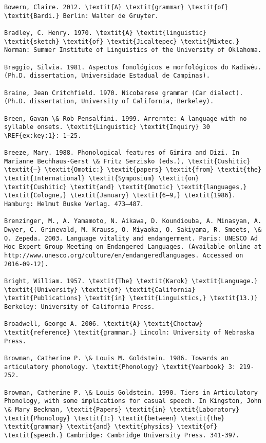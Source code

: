 \begin{verbatim}
Bowern, Claire. 2012. \textit{A} \textit{grammar} \textit{of} \textit{Bardi.} Berlin: Walter de Gruyter.

Bradley, C. Henry. 1970. \textit{A} \textit{linguistic} \textit{sketch} \textit{of} \textit{Jicaltepec} \textit{Mixtec.} Norman: Summer Institute of Linguistics of the University of Oklahoma.

Braggio, Silvia. 1981. Aspectos fonológicos e morfológicos do Kadiwéu. (Ph.D. dissertation, Universidade Estadual de Campinas).

Braine, Jean Critchfield. 1970. Nicobarese grammar (Car dialect). (Ph.D. dissertation, University of California, Berkeley).

Breen, Gavan \& Rob Pensalfini. 1999. Arrernte: A language with no syllable onsets. \textit{Linguistic} \textit{Inquiry} 30 \REF{ex:key:1}: 1–25.

Breeze, Mary. 1988. Phonological features of Gimira and Dizi. In Marianne Bechhaus-Gerst \& Fritz Serzisko (eds.), \textit{Cushitic} \textit{–} \textit{Omotic:} \textit{papers} \textit{from} \textit{the} \textit{International} \textit{Symposium} \textit{on} \textit{Cushitic} \textit{and} \textit{Omotic} \textit{languages,} \textit{Cologne,} \textit{January} \textit{6–9,} \textit{1986}. Hamburg: Helmut Buske Verlag. 473–487.

Brenzinger, M., A. Yamamoto, N. Aikawa, D. Koundiouba, A. Minasyan, A. Dwyer, C. Grinevald, M. Krauss, O. Miyaoka, O. Sakiyama, R. Smeets, \& O. Zepeda. 2003. Language vitality and endangerment. Paris: UNESCO Ad Hoc Expert Group Meeting on Endangered Languages. (Available online at http://www.unesco.org/culture/en/endangeredlanguages. Accessed on 2016-09-12).

Bright, William. 1957. \textit{The} \textit{Karok} \textit{Language.} \textit{(University} \textit{of} \textit{California} \textit{Publications} \textit{in} \textit{Linguistics,} \textit{13.)} Berkeley: University of California Press.

Broadwell, George A. 2006. \textit{A} \textit{Choctaw} \textit{reference} \textit{grammar.} Lincoln: University of Nebraska Press.

Browman, Catherine P. \& Louis M. Goldstein. 1986. Towards an articulatory phonology. \textit{Phonology} \textit{Yearbook} 3: 219-252.

Browman, Catherine P. \& Louis Goldstein. 1990. Tiers in Articulatory Phonology, with some implications for casual speech. In Kingston, John \& Mary Beckman, \textit{Papers} \textit{in} \textit{Laboratory} \textit{Phonology} \textit{I:} \textit{between} \textit{the} \textit{grammar} \textit{and} \textit{physics} \textit{of} \textit{speech.} Cambridge: Cambridge University Press. 341-397.


\end{verbatim}
